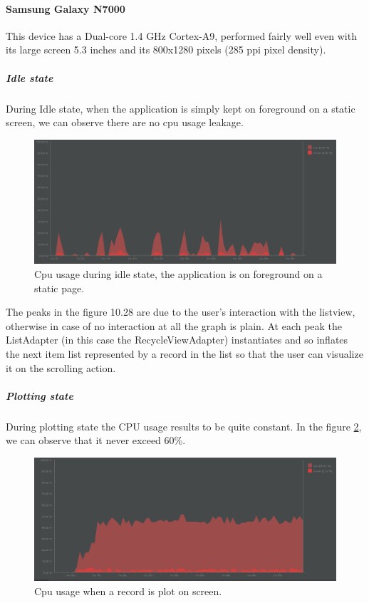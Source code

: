 \paragraph{Samsung Galaxy N7000}
This device has a Dual-core 1.4 GHz Cortex-A9, performed fairly well even with its large screen 5.3 inches and its 800x1280 pixels (285 ppi pixel density).
\subparagraph{Idle state}
During Idle state, when the application is simply kept on foreground on a static screen, we can observe there are no cpu usage leakage.
\begin{figure}[ht!]
	\centering	
	\includegraphics[width=1\linewidth]{figures/ch10/28.png}
	\caption{Cpu usage during idle state, the application is on foreground on a static page.}  
	\label{fig10.28}
\end{figure}
The peaks in the figure 10.28 are due to the user’s interaction with the listview, otherwise in case of no interaction at all the graph is plain. At each peak the ListAdapter (in this case the RecycleViewAdapter) instantiates and so inflates the next item list represented by a record in the list so that the user can visualize it on the scrolling action.
\subparagraph{Plotting state}
During plotting state the CPU usage results to be quite constant. In the figure \ref{fig10.29}, we can observe that it never exceed 60\%.
\begin{figure}[ht!]
	\centering	
	\includegraphics[width=1\linewidth]{figures/ch10/29.png}
	\caption{Cpu usage when a record is plot on screen.}  
	\label{fig10.29}
\end{figure}
